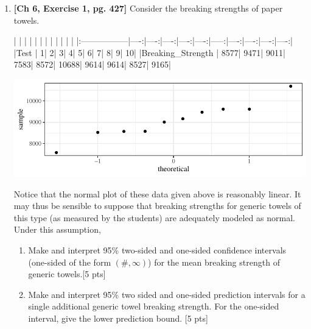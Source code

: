 \documentclass[11pt]{article}\usepackage[]{graphicx}\usepackage[]{color}
\begin{document}
{\begin{enumerate}
    
 \item \textbf{[Ch 6, Exercise 1, pg. 427]} Consider the breaking strengths of paper towels.
 
\begin{Schunk}
\begin{Soutput}
|                  |     |     |     |     |     |      |     |     |     |     |
|:-----------------|----:|----:|----:|----:|----:|-----:|----:|----:|----:|----:|
|Test              |    1|    2|    3|    4|    5|     6|    7|    8|    9|   10|
|Breaking_Strength | 8577| 9471| 9011| 7583| 8572| 10688| 9614| 9614| 8527| 9165|
\end{Soutput}
\end{Schunk}
\includegraphics{stat305_hw8-003}

    Notice that the normal plot of these data given above is reasonably linear. It may thus be sensible to suppose that breaking strengths for generic towels of this type (as measured by the students) are adequately modeled as normal. Under this assumption,
          \begin{enumerate}
            \item Make and interpret 95\% two-sided and one-sided confidence intervals (one-sided of the form $(\#, \infty)$) for the mean breaking strength of generic towels.[5 pts]
            \item Make and interpret 95\% two sided and one-sided prediction intervals for a single additional generic towel breaking strength. For the one-sided interval, give the lower prediction bound. [5 pts]
          \end{enumerate}
    


\end{enumerate}}
\end{document}
